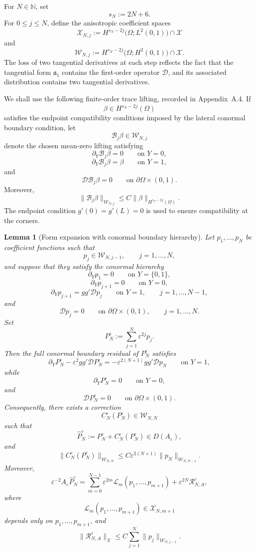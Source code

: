 \documentclass[11pt]{article}
\newtheorem{lemma}[theorem]{Lemma}
\theoremstyle{definition}
\theoremstyle{remark}
\numberwithin{equation}{section}
\begin{document}
For \(N\in\mathbb N\), set
\[
s_N:=2N+6.
\]
For \(0\le j\le N\), define the anisotropic coefficient spaces
\[
\mathcal X_{N,j}
:=
H^{s_N-2j}\bigl(\Omega;L^2(0,1)\bigr)\cap\mathcal X
\]
and
\[
\mathcal W_{N,j}
:=
H^{s_N-2j}\bigl(\Omega;H^2(0,1)\bigr)\cap\mathcal X.
\]
The loss of two tangential derivatives at each step reflects the fact that the
tangential form \(\mathfrak a_1\) contains the first-order operator
\(\mathcal D\), and its associated distribution contains two tangential
derivatives.

We shall use the following finite-order trace lifting, recorded in
Appendix~A.4. If
\[
\beta\in H^{s_N-2j}(\Omega)
\]
satisfies the endpoint compatibility conditions imposed by the lateral
conormal boundary condition, let
\[
\mathscr B_j\beta\in\mathcal W_{N,j}
\]
denote the chosen mean-zero lifting satisfying
\[
\partial_Y\mathscr B_j\beta=0
\qquad\text{on }Y=0,
\]
\[
\partial_Y\mathscr B_j\beta=\beta
\qquad\text{on }Y=1,
\]
and
\[
\mathcal D\mathscr B_j\beta=0
\qquad\text{on }\partial\Omega\times(0,1).
\]
Moreover,
\[
\|\mathscr B_j\beta\|_{\mathcal W_{N,j}}
\le
C\|\beta\|_{H^{s_N-2j}(\Omega)}.
\]
The endpoint condition \(g'(0)=g'(L)=0\) is used to ensure compatibility at the
corners.

\begin{lemma}[Form expansion with conormal boundary hierarchy]
\label{lem:form-expansion-conormal-hierarchy}
Let \(p_1,\dots,p_N\) be coefficient functions such that
\[
p_j\in\mathcal W_{N,j-1},
\qquad
j=1,\dots,N,
\]
and suppose that they satisfy the conormal hierarchy
\[
\partial_Yp_1=0
\qquad\text{on }Y=\{0,1\},
\]
\[
\partial_Yp_{j+1}=0
\qquad\text{on }Y=0,
\]
\[
\partial_Yp_{j+1}=gg'\mathcal Dp_j
\qquad\text{on }Y=1,
\qquad
j=1,\dots,N-1,
\]
and
\[
\mathcal Dp_j=0
\qquad\text{on }\partial\Omega\times(0,1),
\qquad
j=1,\dots,N.
\]
Set
\[
P_N^\varepsilon
:=
\sum_{j=1}^N\varepsilon^{2j} p_j.
\]
Then the full conormal boundary residual of \(P_N^\varepsilon\) satisfies
\[
\partial_YP_N^\varepsilon-\varepsilon^2 gg'\mathcal DP_N^\varepsilon
=
-\varepsilon^{2(N+1)}gg'\mathcal Dp_N
\qquad\text{on }Y=1,
\]
while
\[
\partial_YP_N^\varepsilon=0
\qquad\text{on }Y=0,
\]
and
\[
\mathcal DP_N^\varepsilon=0
\qquad\text{on }\partial\Omega\times(0,1).
\]
Consequently, there exists a correction
\[
C_N^\varepsilon(P_N^\varepsilon)\in\mathcal W_{N,N}
\]
such that
\[
\widehat P_N^\varepsilon
:=
P_N^\varepsilon+C_N^\varepsilon(P_N^\varepsilon)
\in D(A_\varepsilon),
\]
and
\[
\|C_N^\varepsilon(P_N^\varepsilon)\|_{\mathcal W_{N,N}}
\le
C\varepsilon^{2(N+1)}\|p_N\|_{\mathcal W_{N,N-1}}.
\]
Moreover,
\[
\varepsilon^{-2}A_\varepsilon\widehat P_N^\varepsilon
=
\sum_{m=0}^{N-1}\varepsilon^{2m}\mathcal L_m(p_1,\dots,p_{m+1})
+
\varepsilon^{2N}\mathcal R_{N,A}^\varepsilon,
\]
where
\[
\mathcal L_m(p_1,\dots,p_{m+1})
\in\mathcal X_{N,m+1}
\]
depends only on \(p_1,\dots,p_{m+1}\), and
\[
\|\mathcal R_{N,A}^\varepsilon\|_{\mathcal X}
\le
C\sum_{j=1}^N\|p_j\|_{\mathcal W_{N,j-1}}.
\]
\end{lemma}
\end{document}
